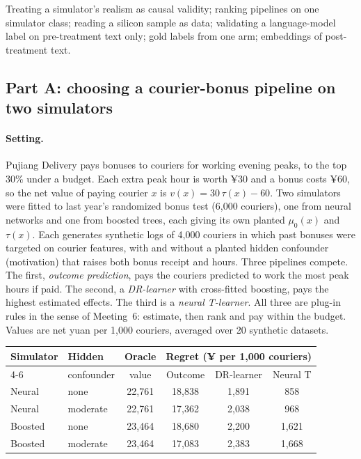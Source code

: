 \documentclass[11pt]{article}
\begin{document}
\begin{pitfall}
Treating a simulator's realism as causal validity; ranking pipelines on one simulator class; reading a silicon sample as data; validating a
language-model label on pre-treatment text only; gold labels from one arm; embeddings of post-treatment text.
\end{pitfall}

\sectiontwo

\subsection*{Part A: choosing a courier-bonus pipeline on two simulators}

\paragraph{Setting.} Pujiang Delivery pays bonuses to couriers for working evening peaks, to the top 30\% under a budget. Each extra peak hour is worth
¥30 and a bonus costs ¥60, so the net value of paying courier $x$ is $v(x) = 30\,\tau(x) - 60$. Two simulators were fitted to last year's
randomized bonus test (6{,}000 couriers), one from neural networks and one from boosted trees, each giving its own planted $\mu_0(x)$ and $\tau(x)$.
Each generates synthetic logs of 4{,}000 couriers in which past bonuses were targeted on courier features, with and without a planted hidden
confounder (motivation) that raises both bonus receipt and hours. Three pipelines compete. The first,
\emph{outcome prediction}, pays the couriers predicted to work the most peak hours if paid. The second, a \emph{DR-learner} with
cross-fitted boosting, pays the highest estimated effects. The third is a \emph{neural T-learner}. All three are plug-in rules in the
sense of Meeting~6: estimate, then rank and pay within the budget. Values are net yuan per 1{,}000 couriers, averaged over 20 synthetic
datasets.
\begin{center}
\begin{tabular}{llcccc}
\toprule
Simulator & Hidden & Oracle & \multicolumn{3}{c}{Regret (¥ per 1{,}000 couriers)} \\
\cmidrule(lr){4-6}
 & confounder & value & Outcome & DR-learner & Neural T \\
\midrule
Neural  & none     & 22{,}761 & 18{,}838 & 1{,}891 & 858 \\
Neural  & moderate & 22{,}761 & 17{,}362 & 2{,}038 & 968 \\
Boosted & none     & 23{,}464 & 18{,}680 & 2{,}200 & 1{,}621 \\
Boosted & moderate & 23{,}464 & 17{,}083 & 2{,}383 & 1{,}668 \\
\bottomrule
\end{tabular}
\end{center}
\end{document}
